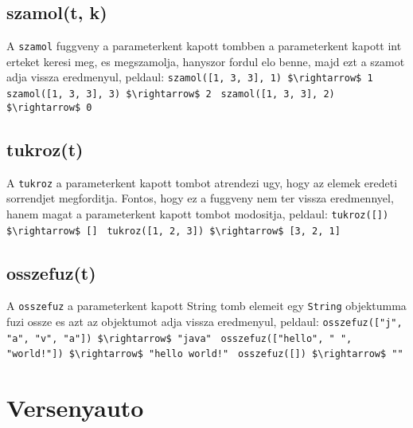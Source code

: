 \documentclass{article}
\begin{document}
\subsection{szamol(t, k)}

A \lstinline{szamol} fuggveny a parameterkent kapott tombben a parameterkent kapott int erteket keresi meg, es megszamolja, hanyszor fordul elo benne, majd ezt a szamot adja vissza eredmenyul, peldaul:\newline
\lstinline[mathescape]{szamol([1, 3, 3], 1) $\rightarrow$ 1 }\newline
\lstinline[mathescape]{szamol([1, 3, 3], 3) $\rightarrow$ 2 }\newline
\lstinline[mathescape]{szamol([1, 3, 3], 2) $\rightarrow$ 0 }\newline

\subsection{tukroz(t)}

A \lstinline{tukroz} a parameterkent kapott tombot atrendezi ugy, hogy az elemek eredeti sorrendjet megforditja. Fontos, hogy ez a fuggveny nem ter vissza eredmennyel, hanem magat a parameterkent kapott tombot modositja, peldaul:\newline
\lstinline[mathescape]{tukroz([]) $\rightarrow$ [] }\newline
\lstinline[mathescape]{tukroz([1, 2, 3]) $\rightarrow$ [3, 2, 1]}\newline

\subsection{osszefuz(t)}

A \lstinline{osszefuz} a parameterkent kapott String tomb elemeit egy \lstinline{String} objektumma fuzi ossze es azt az objektumot adja vissza eredmenyul, peldaul:\newline
\lstinline[mathescape]{osszefuz(["j", "a", "v", "a"]) $\rightarrow$ "java" }\newline
\lstinline[mathescape]{osszefuz(["hello", " ", "world!"]) $\rightarrow$ "hello world!" }\newline
\lstinline[mathescape]{osszefuz([]) $\rightarrow$ "" }\newline

\newpage

\section{Versenyauto}
\end{document}
